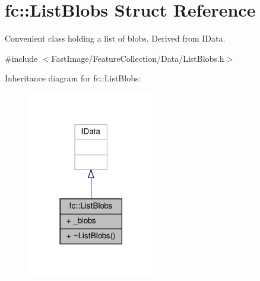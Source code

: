 \hypertarget{structfc_1_1ListBlobs}{}\section{fc\+:\+:List\+Blobs Struct Reference}
\label{structfc_1_1ListBlobs}


Convenient class holding a list of blobs. Derived from I\+Data.  




{\ttfamily \#include $<$Fast\+Image/\+Feature\+Collection/\+Data/\+List\+Blobs.\+h$>$}



Inheritance diagram for fc\+:\+:List\+Blobs\+:
\nopagebreak
\begin{figure}[H]
\begin{center}
\leavevmode
\includegraphics[width=158pt]{d4/d68/structfc_1_1ListBlobs__inherit__graph}
\end{center}
\end{figure}


